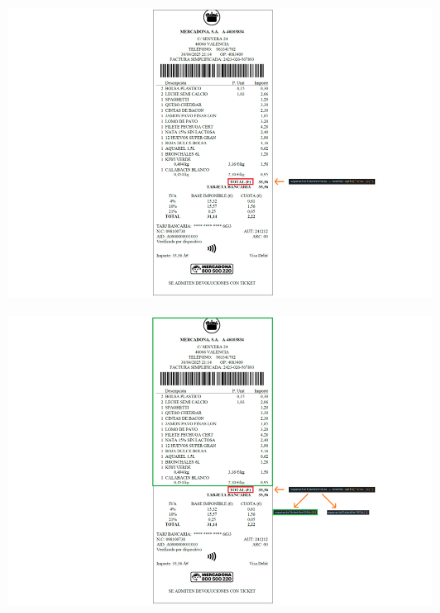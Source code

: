 \documentclass{beamer}
\begin{document}
	
		
		\begin{frame}
			\begin{figure}
				\centering
				\includegraphics[width=1\linewidth]{imgEspecifiques/ticketExtraccioB.png}
				\label{fig:ticketExtraccioB}
			\end{figure}
		\end{frame}
		
		\begin{frame}
			\begin{figure}
				\centering
				\includegraphics[width=1\linewidth]{imgEspecifiques/ticketExtraccioC.png}
				\label{fig:ticketExtraccioC}
			\end{figure}
		\end{frame}
		
\end{document}
